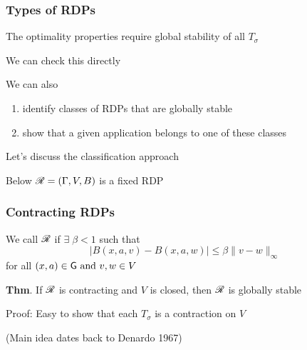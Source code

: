 \documentclass[dvipsnames]{beamer}
\begin{document}
\begin{frame}
    \frametitle{Types of RDPs}

    The optimality properties require global stability of all $T_\sigma$

        \vspace{0.5em}
    We can check this directly


        \vspace{0.5em}
    We can also 
    \begin{enumerate}
        \item identify classes of RDPs that are globally stable
        \vspace{0.5em}
        \item show that a given application belongs to one of these classes
    \end{enumerate}


    
        \vspace{0.5em}
        \vspace{0.5em}
        \vspace{0.5em}

    Let's discuss the classification approach

        \vspace{0.5em}
        \vspace{0.5em}
    Below $\mathscr R = (\Gamma, V, B)$ is a fixed RDP

\end{frame}

\begin{frame}
    \frametitle{Contracting RDPs}


        \vspace{0.5em}
    We call $\mathscr R$  if $\exists \; \beta < 1$ such that
    \begin{equation*}
       | B(x, a, v) - B(x, a, w)| 
       \leq \beta  \| v - w \|_\infty
    \end{equation*}
   for all $(x, a) \in \mathsf G \text{ and } v, w \in V$


        \vspace{0.5em}
        \vspace{0.5em}
   {\bf Thm}. If $\mathscr R$ is contracting and $V$ is closed, then $\mathscr R$ is
   globally stable


        \vspace{0.5em}
   Proof: Easy to show that each $T_\sigma$ is a contraction on $V$


        \vspace{0.5em}
        \vspace{0.5em}
        \vspace{0.5em}
   (Main idea dates back to Denardo 1967)


\end{frame}
\end{document}
